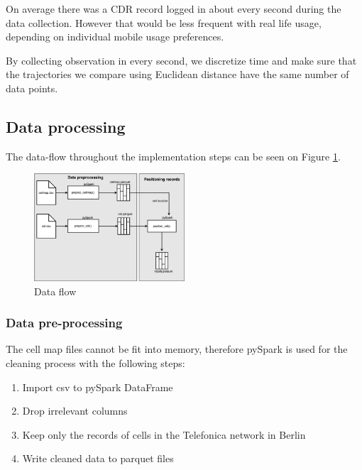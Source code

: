On average there was a CDR record logged in about every second during the data collection. However that would be less frequent with real life usage, depending on individual mobile usage preferences. 

By collecting observation in every second, we discretize time and make sure that the trajectories we compare using Euclidean distance have the same number of data points.

\subsection{Data processing}\label{sec:data-proc}
The data-flow throughout the implementation steps can be seen on Figure \ref{fig:data-flow}.
\begin{figure}[h]
    \centering
    \includegraphics[width=0.5\textwidth]{images/data-flow.png}
    \caption{Data flow}
    \label{fig:data-flow}
\end{figure}

\subsubsection{Data pre-processing}
The cell map files cannot be fit into memory, therefore pySpark is used for the cleaning process with the following steps: 
\begin{enumerate}
    \item Import csv to pySpark DataFrame
    \item Drop irrelevant columns
    \item Keep only the records of cells in the Telefonica network in Berlin
    \item Write cleaned data to parquet files
\end{enumerate}

